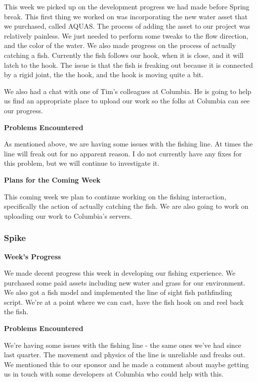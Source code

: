 \documentclass[10pt,journal,compsoc,onecolumn, draftclsnofoot]{IEEEtran}
\begin{document}
This week we picked up on the development progress we had made before Spring break. This first thing we worked on was incorporating the new water asset that we purchased, called AQUAS. The process of adding the asset to our project was relatively painless. We just needed to perform some tweaks to the flow direction, and the color of the water. We also made progress on the process of actually catching a fish. Currently the fish follows our hook, when it is close, and it will latch to the hook. The issue is that the fish is freaking out because it is connected by a rigid joint, the the hook, and the hook is moving quite a bit.

We also had a chat with one of Tim's colleagues at Columbia. He is going to help us find an appropriate place to upload our work so the folks at Columbia can see our progress.

\noindent \textbf{Problems Encountered}

As mentioned above, we are having some issues with the fishing line. At times the line will freak out for no apparent reason. I do not currently have any fixes for this problem, but we will continue to investigate it.

\noindent \textbf{Plans for the Coming Week}

This coming week we plan to continue working on the fishing interaction, specifically the action of actually catching the fish. We are also going to work on uploading our work to Columbia's servers.

\subsubsection{Spike}
\noindent \textbf{Week's Progress}

We made decent progress this week in developing our fishing experience. We purchased some paid assets including new water and grass for our environment. We also got a fish model and implemented the line of sight fish pathfinding script. We're at a point where we can cast, have the fish hook on and reel back the fish.

\noindent \textbf{Problems Encountered}

We're having some issues with the fishing line - the same ones we've had since last quarter. The movement and physics of the line is unreliable and freaks out. We mentioned this to our sponsor and he made a comment about maybe getting us in touch with some developers at Columbia who could help with this.
\end{document}
